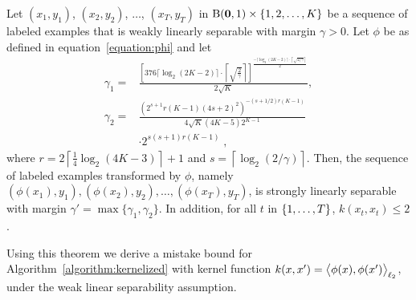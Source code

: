 \begin{theorem}
\label{theorem:margin-transformation}
Let $(x_1, y_1)$, $(x_2, y_2)$, $\dots$, $(x_T, y_T)$ in $\operatorname{B}(\mathbf{0},1) \times
\{1,2,\dots,K\}$ be a sequence of labeled examples that is weakly linearly
separable with margin $\gamma > 0$. Let $\phi$ be as defined in
equation~\eqref{equation:phi} and let
\begingroup
\allowdisplaybreaks
\begin{align*}
\gamma_1 = & \frac{ 
  \left[
    376 \lceil \log_2(2K-2) \rceil \cdot \left \lceil \sqrt{\frac{2}{\gamma}} \right \rceil 
  \right]^{
    \frac{-\lceil \log_2(2K-2) \rceil \cdot \left \lceil \sqrt{{2}/{\gamma}} \right \rceil}{2}
  }
}{2\sqrt{K}}, 
\\
\gamma_2 = & \frac{
   \left(2^{s+1} r(K-1) (4s+2)^2 \right)^{-(s+1/2)r(K-1)} 
}{4\sqrt{K}(4K-5) 2^{K-1}}
\\
&  \cdot 2^{s(s+1)r(K-1)}
\; ,
\end{align*}
\endgroup
where $r = 2 \left\lceil \frac{1}{4} \log_2(4K-3) \right\rceil + 1$ and $s = \left \lceil \log_2(2/\gamma) \right \rceil$.
Then, the sequence of labeled examples transformed by $\phi$,
namely $(\phi(x_1), y_1), (\phi(x_2), y_2), \dots,
(\phi(x_T), y_T)$, is strongly linearly separable with margin $\gamma' =
\max\{\gamma_1, \gamma_2\}$. In addition, for all $t$ in $\cbr{1,\ldots,T}$,
$k(x_t,x_t) \leq 2$.
\end{theorem}

Using this theorem we derive a mistake bound for
Algorithm~\ref{algorithm:kernelized} with kernel function $k(x,x') =
\left\langle \phi(x), \phi(x') \right\rangle_{\ell_2}$, under the weak linear separability assumption.

